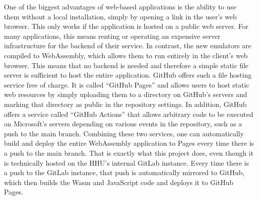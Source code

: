 One of the biggest advantages of web-based applications is the ability to use them without a local installation, simply by opening a link in the user's web browser.
This only works if the application is hosted on a public web server.
For many applications, this means renting or operating an expensive server infrastructure for the backend of their service.
In contrast, the new emulators are compiled to WebAssembly, which allows them to run entirely in the client's web browser.
This means that no backend is needed and therefore a simple static file server is sufficient to host the entire application.
GitHub offers such a file hosting service free of charge.
It is called ``GitHub Pages'' and allows users to host static web resources by simply uploading them to a directory on GitHub's servers and marking that directory as public in the repository settings.
In addition, GitHub offers a service called ``GitHub Actions'' that allows arbitrary code to be executed on Microsoft's servers depending on various events in the repository, such as a push to the main branch.
Combining these two services, one can automatically build and deploy the entire WebAssembly application to Pages every time there is a push to the main branch.
That is exactly what this project does, even though it is technically hosted on the HHU's internal GitLab instance.
Every time there is a push to the GitLab instance, that push is automatically mirrored to GitHub, which then builds the Wasm and JavaScript code and deploys it to GitHub Pages.

